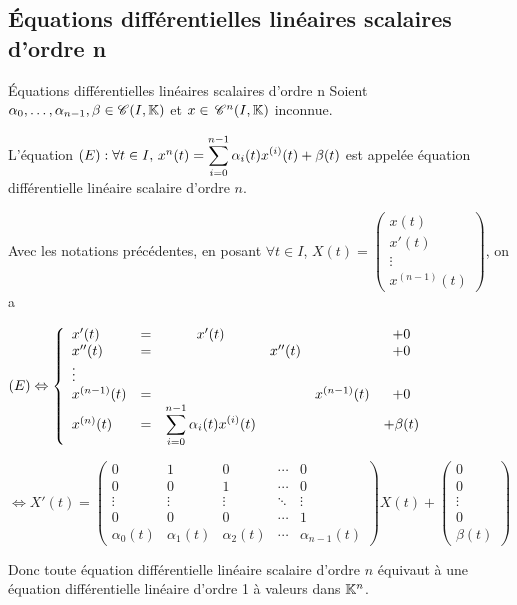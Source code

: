 \subsection{\'Equations différentielles linéaires scalaires d'ordre n}

\begin{definition}{\'Equations différentielles linéaires scalaires d'ordre n}{}
    Soient $\alpha_0, \dots, \alpha_{n-1}, \beta \in \mathscr C(I, \mathbb{K})$ et 
    $x \in \,\mathscr C^{n} (I, \mathbb{K})$ inconnue. 

    L'équation $(E) : \forall t \in I, \, x^n(t) = \displaystyle \sum_{i = 0}^{n - 1} \alpha_i(t) x^{(i)}(t) + \beta(t)$ est 
    appelée équation différentielle linéaire scalaire d'ordre $n$.
\end{definition}

\begin{proposition}{}{}
    Avec les notations précédentes, en posant $\forall t \in I$, 
    $X(t) = \begin{pmatrix}
        x(t) \\ x'(t) \\ \vdots \\ x^{(n-1)}(t)
    \end{pmatrix}$, on a 

    $(E) \Leftrightarrow \left\{ \begin{array}{lccccc}
        x'(t) & = & x'(t) & & & + 0 \\
        x''(t) & = & & x''(t) & & + 0 \\
        \vdots & & & & & \\
        x^{(n-1)}(t) & = &  & & x^{(n-1)}(t) & + 0 \\
        x^{(n)}(t) & = & \displaystyle \sum_{i = 0}^{n - 1} \alpha_i(t) x^{(i)}(t) & & & + \beta(t) 
    \end{array} \right.$

    $\Leftrightarrow X'(t) = \begin{pmatrix}
        0 & 1 & 0 & \cdots & 0 \\
        0 & 0 & 1 & \cdots & 0 \\
        \vdots & \vdots & \vdots & \ddots & \vdots \\
        0 & 0 & 0 & \cdots & 1 \\
        \alpha_0(t) & \alpha_1(t) & \alpha_2(t) & \cdots & \alpha_{n-1}(t)
     \end{pmatrix} X(t) + \begin{pmatrix}
        0 \\ 0 \\ \vdots \\ 0 \\ \beta(t)
    \end{pmatrix}$

    \svspace Donc toute équation différentielle linéaire scalaire d'ordre $n$ équivaut à une équation différentielle 
    linéaire d'ordre 1 à valeurs dans $\mathbb{K}^n$.
\end{proposition}

